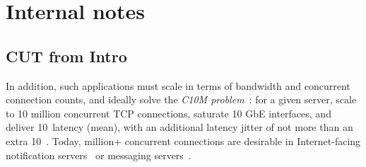 
\section{Internal notes}


\subsection{ CUT from Intro}



In addition, such applications must scale in terms of bandwidth and
concurrent connection counts, and ideally solve the \emph{C10M
  problem}~\cite{theC10Mproblem}: for a given server, scale to 10
million concurrent TCP connections, saturate 10 GbE interfaces, and
deliver 10~\microsecond latency (mean), with an additional latency
jitter of not more than an extra 10~\microsecond.  Today, million+
concurrent connections are desirable in Internet-facing notification
servers~\cite{DBLP:conf/sosp/AdyaCMP11} or messaging
servers~\cite{whatsapp-2mil}. 



